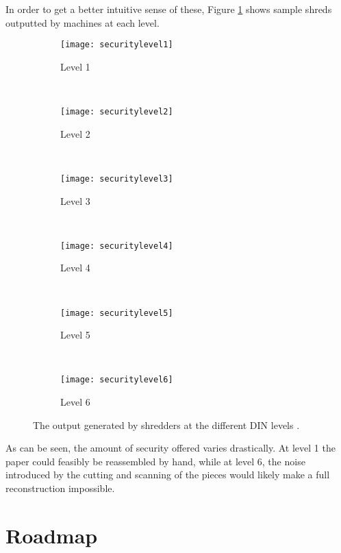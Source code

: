 \clearpage
In order to get a better intuitive sense of these, Figure \ref{fig:dinOut} shows sample shreds outputted by machines at each level.

\begin{figure}[h]
        \centering
        \begin{subfigure}[b]{0.15\textwidth}
                \centering
                \texttt{[image: securitylevel1]}
                \caption{Level 1}
        \end{subfigure}
        ~ 
        \begin{subfigure}[b]{0.15\textwidth}
                \centering
                \texttt{[image: securitylevel2]}
                \caption{Level 2}
        \end{subfigure}
        ~ 
        \begin{subfigure}[b]{0.15\textwidth}
                \centering
                \texttt{[image: securitylevel3]}
                \caption{Level 3}
        \end{subfigure}
        ~ 
        \begin{subfigure}[b]{0.15\textwidth}
                \centering
                \texttt{[image: securitylevel4]}
                \caption{Level 4}
        \end{subfigure}
        ~ 
        \begin{subfigure}[b]{0.15\textwidth}
                \centering
                \texttt{[image: securitylevel5]}
                \caption{Level 5}
        \end{subfigure}
        ~ 
        \begin{subfigure}[b]{0.15\textwidth}
                \centering
                \texttt{[image: securitylevel6]}
                \caption{Level 6}
        \end{subfigure}
        \caption{The output generated by shredders at the different DIN levels \cite{P17}. }
        \label{fig:dinOut}
\end{figure}

As can be seen, the amount of security offered varies drastically. At level 1 the paper could feasibly be reassembled by hand, while at level 6, the noise introduced by the cutting and scanning of the pieces would likely make a full reconstruction impossible.

\section{Roadmap}

